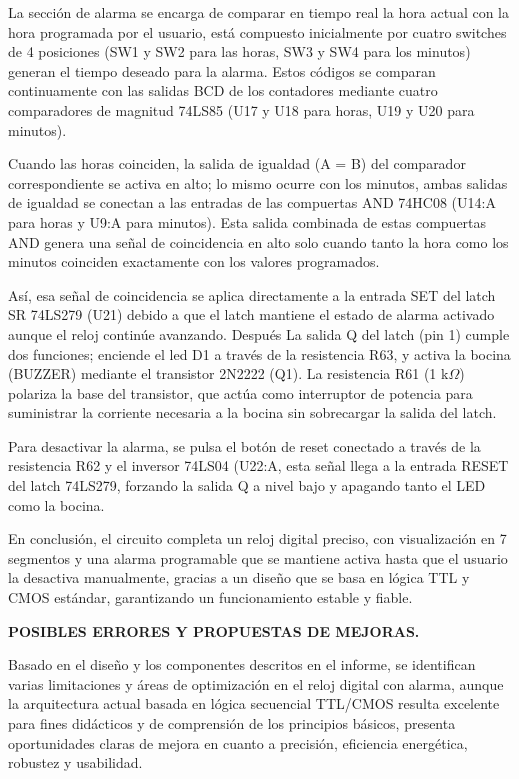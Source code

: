 \documentclass[12pt,letterpaper]{article}
\begin{document}
\indent La sección de alarma se encarga de comparar en tiempo real la hora actual con la hora programada por el usuario, está compuesto inicialmente por cuatro switches de 4 posiciones (SW1 y SW2 para las horas, SW3 y SW4 para los minutos) generan el tiempo deseado para la alarma. Estos códigos se comparan continuamente con las salidas BCD de los contadores mediante cuatro comparadores de magnitud 74LS85 (U17 y U18 para horas, U19 y U20 para minutos). 

\indent Cuando las horas coinciden, la salida de igualdad (A = B) del comparador correspondiente se activa en alto; lo mismo ocurre con los minutos, ambas salidas de igualdad se conectan a las entradas de las compuertas AND 74HC08 (U14:A para horas y U9:A para minutos). Esta salida combinada de estas compuertas AND genera una señal de coincidencia en alto solo cuando tanto la hora como los minutos coinciden exactamente con los valores programados.  

\indent Así, esa señal de coincidencia se aplica directamente a la entrada SET del latch SR 74LS279 (U21) debido a que el latch mantiene el estado de alarma activado aunque el reloj continúe avanzando. Después La salida Q del latch (pin 1) cumple dos funciones; enciende el led D1 a través de la resistencia R63, y activa la bocina (BUZZER) mediante el transistor 2N2222 (Q1). La resistencia R61 (1 k$\Omega$) polariza la base del transistor, que actúa como interruptor de potencia para suministrar la corriente necesaria a la bocina sin sobrecargar la salida del latch. 

\indent Para desactivar la alarma, se pulsa el botón de reset conectado a través de la resistencia R62 y el inversor 74LS04 (U22:A, esta señal llega a la entrada RESET del latch 74LS279, forzando la salida Q a nivel bajo y apagando tanto el LED como la bocina. 

\indent En conclusión, el circuito completa un reloj digital preciso, con visualización en 7 segmentos y una alarma programable que se mantiene activa hasta que el usuario la desactiva manualmente, gracias a un diseño que se basa en lógica TTL y CMOS estándar, garantizando un funcionamiento estable y fiable.  

\pagebreak

\textbf{POSIBLES ERRORES Y PROPUESTAS DE MEJORAS.}

\indent Basado en el diseño y los componentes descritos en el informe, se identifican varias limitaciones y áreas de optimización en el reloj digital con alarma, aunque la arquitectura actual basada en lógica secuencial TTL/CMOS resulta excelente para fines didácticos y de comprensión de los principios básicos, presenta oportunidades claras de mejora en cuanto a precisión, eficiencia energética, robustez y usabilidad.  
\end{document}
